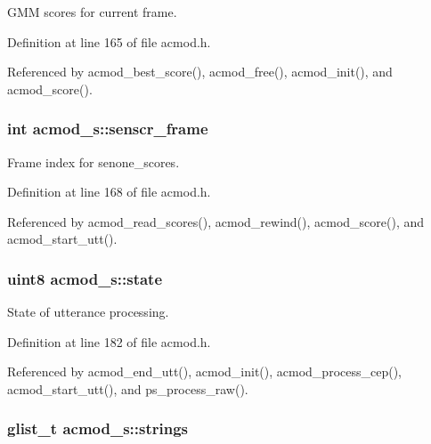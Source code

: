G\-M\-M scores for current frame. 



Definition at line 165 of file acmod.\-h.



Referenced by acmod\-\_\-best\-\_\-score(), acmod\-\_\-free(), acmod\-\_\-init(), and acmod\-\_\-score().

\subsubsection[{senscr\-\_\-frame}]{\setlength{\rightskip}{0pt plus 5cm}int acmod\-\_\-s\-::senscr\-\_\-frame}\label{structacmod__s_ab70ba4caf96b656936d499247e921f00}


Frame index for senone\-\_\-scores. 



Definition at line 168 of file acmod.\-h.



Referenced by acmod\-\_\-read\-\_\-scores(), acmod\-\_\-rewind(), acmod\-\_\-score(), and acmod\-\_\-start\-\_\-utt().

\subsubsection[{state}]{\setlength{\rightskip}{0pt plus 5cm}uint8 acmod\-\_\-s\-::state}\label{structacmod__s_a06adf606c11e6f4b9869742510a5c23b}


State of utterance processing. 



Definition at line 182 of file acmod.\-h.



Referenced by acmod\-\_\-end\-\_\-utt(), acmod\-\_\-init(), acmod\-\_\-process\-\_\-cep(), acmod\-\_\-start\-\_\-utt(), and ps\-\_\-process\-\_\-raw().

\subsubsection[{strings}]{\setlength{\rightskip}{0pt plus 5cm}glist\-\_\-t acmod\-\_\-s\-::strings}\label{structacmod__s_a9f6b699a0fbd43cf7ababab6f0ab81be}


